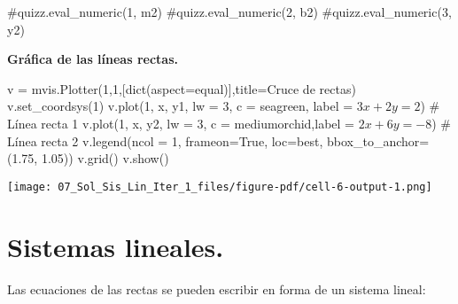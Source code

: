 \documentclass[
  letterpaper,
  DIV=11,
  numbers=noendperiod]{scrreprt}
\newenvironment{Shaded}{\begin{snugshade}}{\end{snugshade}}
\newcommand{\BuiltInTok}[1]{\textcolor[rgb]{0.00,0.23,0.31}{#1}}
\newcommand{\CommentTok}[1]{\textcolor[rgb]{0.37,0.37,0.37}{#1}}
\newcommand{\DecValTok}[1]{\textcolor[rgb]{0.68,0.00,0.00}{#1}}
\newcommand{\FloatTok}[1]{\textcolor[rgb]{0.68,0.00,0.00}{#1}}
\newcommand{\NormalTok}[1]{\textcolor[rgb]{0.00,0.23,0.31}{#1}}
\newcommand{\OperatorTok}[1]{\textcolor[rgb]{0.37,0.37,0.37}{#1}}
\newcommand{\StringTok}[1]{\textcolor[rgb]{0.13,0.47,0.30}{#1}}
\newcommand{\VariableTok}[1]{\textcolor[rgb]{0.07,0.07,0.07}{#1}}
\begin{document}
\begin{Shaded}
\begin{Highlighting}[]
\CommentTok{\#quizz.eval\_numeric(\textquotesingle{}1\textquotesingle{}, m2)}
\CommentTok{\#quizz.eval\_numeric(\textquotesingle{}2\textquotesingle{}, b2)}
\CommentTok{\#quizz.eval\_numeric(\textquotesingle{}3\textquotesingle{}, y2)}
\end{Highlighting}
\end{Shaded}

\textbf{Gráfica de las líneas rectas.}

\begin{Shaded}
\begin{Highlighting}[]
\NormalTok{v }\OperatorTok{=}\NormalTok{ mvis.Plotter(}\DecValTok{1}\NormalTok{,}\DecValTok{1}\NormalTok{,[}\BuiltInTok{dict}\NormalTok{(aspect}\OperatorTok{=}\StringTok{\textquotesingle{}equal\textquotesingle{}}\NormalTok{)],title}\OperatorTok{=}\StringTok{\textquotesingle{}Cruce de rectas\textquotesingle{}}\NormalTok{) }
\NormalTok{v.set\_coordsys(}\DecValTok{1}\NormalTok{)}
\NormalTok{v.plot(}\DecValTok{1}\NormalTok{, x, y1, lw }\OperatorTok{=} \DecValTok{3}\NormalTok{, c }\OperatorTok{=} \StringTok{\textquotesingle{}seagreen\textquotesingle{}}\NormalTok{, label }\OperatorTok{=} \StringTok{\textquotesingle{}$3x+2y=2$\textquotesingle{}}\NormalTok{) }\CommentTok{\# Línea recta 1}
\NormalTok{v.plot(}\DecValTok{1}\NormalTok{, x, y2, lw }\OperatorTok{=} \DecValTok{3}\NormalTok{, c }\OperatorTok{=} \StringTok{\textquotesingle{}mediumorchid\textquotesingle{}}\NormalTok{,label }\OperatorTok{=} \StringTok{\textquotesingle{}$2x+6y={-}8$\textquotesingle{}}\NormalTok{) }\CommentTok{\# Línea recta 2}
\NormalTok{v.legend(ncol }\OperatorTok{=} \DecValTok{1}\NormalTok{, frameon}\OperatorTok{=}\VariableTok{True}\NormalTok{, loc}\OperatorTok{=}\StringTok{\textquotesingle{}best\textquotesingle{}}\NormalTok{, bbox\_to\_anchor}\OperatorTok{=}\NormalTok{(}\FloatTok{1.75}\NormalTok{, }\FloatTok{1.05}\NormalTok{))}
\NormalTok{v.grid()}
\NormalTok{v.show()}
\end{Highlighting}
\end{Shaded}

\texttt{[image: 07\_Sol\_Sis\_Lin\_Iter\_1\_files/figure-pdf/cell-6-output-1.png]}

\section{Sistemas lineales.}\label{sistemas-lineales.}

Las ecuaciones de las rectas se pueden escribir en forma de un sistema
lineal:
\end{document}
